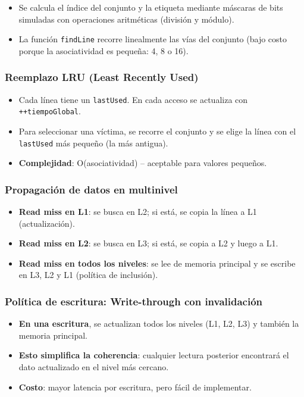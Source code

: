 \documentclass[12pt, letterpaper]{article}
\begin{document}
\begin{itemize}
    \item Se calcula el índice del conjunto y la etiqueta mediante máscaras de bits simuladas con operaciones aritméticas (división y módulo).
    \item La función \texttt{findLine} recorre linealmente las vías del conjunto (bajo costo porque la asociatividad es pequeña: 4, 8 o 16).
\end{itemize}

\subsubsection{Reemplazo LRU (Least Recently Used)}

\begin{itemize}
    \item Cada línea tiene un \texttt{lastUsed}. En cada acceso se actualiza con \texttt{++tiempoGlobal}.
    \item Para seleccionar una víctima, se recorre el conjunto y se elige la línea con el \texttt{lastUsed} más pequeño (la más antigua).
    \item \textbf{Complejidad}: O(asociatividad) – aceptable para valores pequeños.
\end{itemize}

\subsubsection{Propagación de datos en multinivel}

\begin{itemize}
    \item \textbf{Read miss en L1}: se busca en L2; si está, se copia la línea a L1 (actualización).
    \item \textbf{Read miss en L2}: se busca en L3; si está, se copia a L2 y luego a L1.
    \item \textbf{Read miss en todos los niveles}: se lee de memoria principal y se escribe en L3, L2 y L1 (política de inclusión).
\end{itemize}

\subsubsection{Política de escritura: Write-through con invalidación}

\begin{itemize}
    \item \textbf{En una escritura}, se actualizan todos los niveles (L1, L2, L3) y también la memoria principal.
    \item \textbf{Esto simplifica la coherencia}: cualquier lectura posterior encontrará el dato actualizado en el nivel más cercano.
    \item \textbf{Costo}: mayor latencia por escritura, pero fácil de implementar.
\end{itemize}
\end{document}
